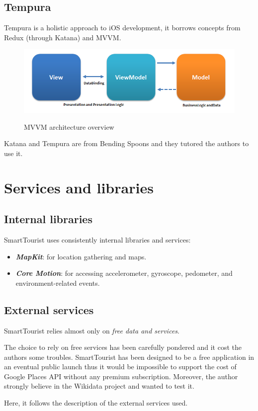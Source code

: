 \documentclass[a4paper, 11pt, parskip=half]{scrreprt}
\theoremstyle{definition}
\newenvironment{warn}[1][Warning:]{ %
	\medskip
	\begin{mdframed}[style=warning]
		\noindent{\textbf{#1}}
}{
	\end{mdframed}
}
\begin{document}
\section{Tempura}
Tempura is a holistic approach to iOS development, it borrows concepts from Redux (through Katana) and MVVM.

\begin{figure}[H]
  	\centering
  	\includegraphics[width=0.9\linewidth]{mvvm}
  	\label{fig:test1}
	\caption{MVVM architecture overview}
\end{figure}

\begin{warn}
	Katana and Tempura are from Bending Spoons and they tutored the authors to use it.
\end{warn}

\chapter{Services and libraries}

\section{Internal libraries}

SmartTourist uses consistently internal libraries and services:

\begin{itemize}
	\item \textbf{\textit{MapKit}}: for location gathering and maps.
	\item \textbf{\textit{Core Motion}}: for accessing accelerometer, gyroscope, pedometer, and environment-related events.
\end{itemize}

\section{External services}

SmartTourist relies almost only on \textit{free data and services}. 
\begin{warn}
The choice to rely on free services has been carefully pondered and it cost the authors some troubles. SmartTourist has been designed to be a free application in an eventual public launch thus it would be impossible to support the cost of Google Places API without any premium subscription. Moreover, the author strongly believe in the Wikidata project and wanted to test it.
\end{warn}
Here, it follows the description of the external services used.
\end{document}

